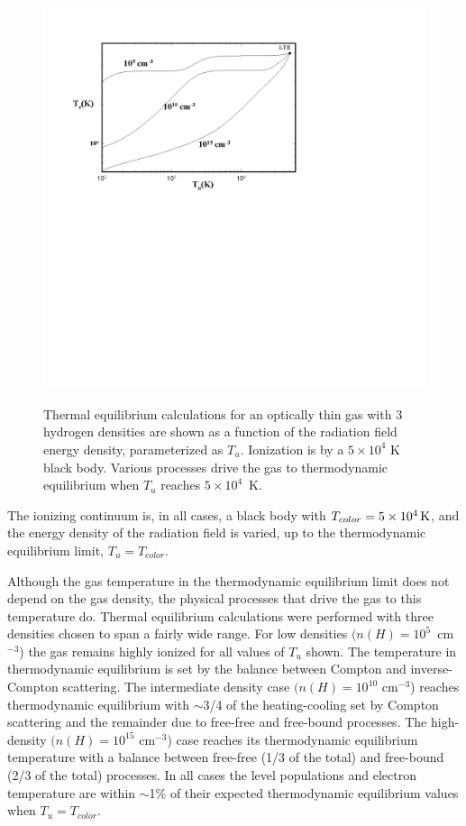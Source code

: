 \begin{figure}
\centering
\includegraphics[scale=0.9]{HydrogenRadiationSTE}
\label{fig:HydrogenRadiationSTE}
\caption[Pure hydrogen approach to STE]{Thermal equilibrium calculations for an optically thin gas with
3 hydrogen densities are shown as a function of the radiation field energy
density, parameterized as $T_u$.  Ionization is by a $5 \times 10^4$ K black body.
Various processes drive the gas to thermodynamic equilibrium when $T_u$ reaches
$5\times 10^4$~K.}
\end{figure}

The ionizing continuum is, in all cases,
a black body with $T_{color} = 5\times 10^4 {\rm\thinspace K}$,
and the energy density of the radiation field is varied, up to the
thermodynamic equilibrium limit, $T_u = T_{color}$.

Although the gas temperature in the thermodynamic equilibrium limit does
not depend on the gas density, the physical processes that drive the gas
to this temperature do.  Thermal equilibrium calculations were performed
with three densities chosen to span a fairly wide range.  For low densities
$(n(H) = 10^5$~cm$^{-3}$) the gas remains highly ionized for all values of
$T_u$ shown.
The temperature in thermodynamic equilibrium is set by the balance between
Compton and inverse-Compton scattering.  The intermediate density case $(n(H)
= 10^{10}$ cm$^{-3}$) reaches thermodynamic equilibrium with $\sim$3/4 of the
heating-cooling set by Compton scattering and the remainder due to free-free
and free-bound processes.  The high-density $(n(H) = 10^{15}$ cm$^{-3}$) case reaches
its thermodynamic equilibrium temperature with a balance between free-free
(1/3 of the total) and free-bound (2/3 of the total) processes.  In all
cases the level populations and electron temperature are within $\sim$1\% of their
expected thermodynamic equilibrium values when $T_u = T_{color}$.

